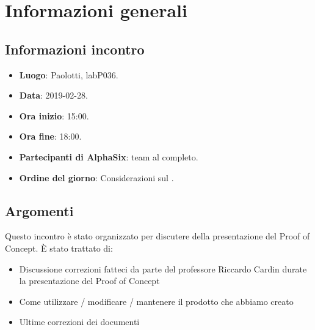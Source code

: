 \newcommand{\documento}{\VI}
\newcommand{\nomedocumentofisico}{VI\_2019-02-28.pdf}
\newcommand{\redazione}{\MM}
\newcommand{\verifica}{\CV}
\newcommand{\approvazione}{\SG}
\newcommand{\versione}{1.0.0}
\newcommand{\uso}{Interno}
\newcommand{\destinateTo}{\gruppo}
\newcommand{\datacreazione}{01 marzo 2019}
\newcommand{\datamodifica}{03 marzo 2019}
\newcommand{\stato}{Approvato}

\def\TABELLE{false}	%
\def\FIGURE{false} 	%






    

    	
    
    \section{Informazioni generali}
		\subsection{Informazioni incontro}
			\begin{itemize}
				\item \textbf{Luogo}: Paolotti, labP036.
				\item \textbf{Data}: 2019-02-28.
				\item \textbf{Ora inizio}: 15:00.
				\item \textbf{Ora fine}: 18:00.
				\item \textbf{Partecipanti di AlphaSix}: team al completo.
				\item \textbf{Ordine del giorno}: Considerazioni sul .
			\end{itemize}

        \subsection{Argomenti}
            Questo incontro è stato organizzato per discutere della presentazione del Proof of Concept. È stato trattato di:
            \begin{itemize}
                \item Discussione correzioni fatteci da parte del professore Riccardo Cardin durate la presentazione del Proof of Concept
                \item Come utilizzare / modificare / mantenere il prodotto che abbiamo creato
                \item Ultime correzioni dei documenti
            \end{itemize}

